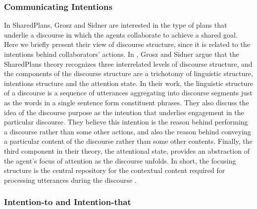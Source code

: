 \documentclass[12pt]{report}
\begin{document}
\subsubsection{Communicating Intentions}
In SharedPlans, Grosz and Sidner are interested in the type of plans that
underlie a discourse in which the agents collaborate to achieve a shared goal.
Here we briefly present their view of discourse structure, since it is related
to the intentions behind collaborators' actions. In
\cite{grosz:plans-discourse}, Grosz and Sidner argue that the SharedPlans theory
recognizes three interrelated levels of discourse structure, and the components
of the discourse structure are a trichotomy of linguistic structure, intentions
structure and the attention state. In their work, the linguistic structure of a
discourse is a sequence of utterances aggregating into discourse segments just
as the words in a single sentence form constituent phrases. They also discuss
the idea of the discourse purpose as the intention that underlies engagement in
the particular discourse. They believe this intention is the reason behind
performing a discourse rather than some other actions, and also the reason
behind conveying a particular content of the discourse rather than some other
contents.
Finally, the third component in their theory, the attentional state, provides an
abstraction of the agent's focus of attention as the discourse unfolds. 
In short, the focusing structure is the central repository for the contextual
content required for processing utterances during the discourse
\cite{grosz:plans-discourse}. 

\vspace*{-5mm}
\subsubsection{Intention-to and Intention-that}
\label{sec:intend-to-that}
\vspace*{-3mm}
\end{document}
